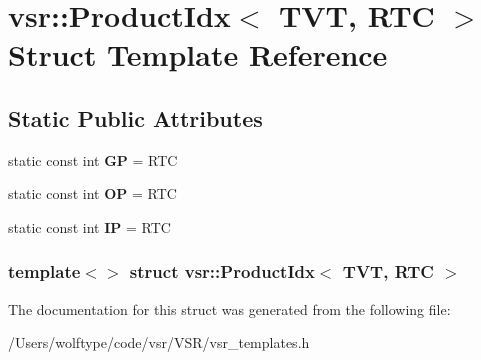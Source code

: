 \hypertarget{structvsr_1_1_product_idx_3_01_t_v_t_00_01_r_t_c_01_4}{\section{vsr\-:\-:Product\-Idx$<$ T\-V\-T, R\-T\-C $>$ Struct Template Reference}
\label{structvsr_1_1_product_idx_3_01_t_v_t_00_01_r_t_c_01_4}
}
\subsection*{Static Public Attributes}
\begin{DoxyCompactItemize}
\item 
\hypertarget{structvsr_1_1_product_idx_3_01_t_v_t_00_01_r_t_c_01_4_a86090849fcb1f5ce52d13ec021fcdabc}{static const int {\bfseries G\-P} = R\-T\-C}\label{structvsr_1_1_product_idx_3_01_t_v_t_00_01_r_t_c_01_4_a86090849fcb1f5ce52d13ec021fcdabc}

\item 
\hypertarget{structvsr_1_1_product_idx_3_01_t_v_t_00_01_r_t_c_01_4_a257314c812d5aa92244504b62511c43a}{static const int {\bfseries O\-P} = R\-T\-C}\label{structvsr_1_1_product_idx_3_01_t_v_t_00_01_r_t_c_01_4_a257314c812d5aa92244504b62511c43a}

\item 
\hypertarget{structvsr_1_1_product_idx_3_01_t_v_t_00_01_r_t_c_01_4_a1b6b128a259ef16fc0236467123d5942}{static const int {\bfseries I\-P} = R\-T\-C}\label{structvsr_1_1_product_idx_3_01_t_v_t_00_01_r_t_c_01_4_a1b6b128a259ef16fc0236467123d5942}

\end{DoxyCompactItemize}
\subsubsection*{template$<$$>$ struct vsr\-::\-Product\-Idx$<$ T\-V\-T, R\-T\-C $>$}



The documentation for this struct was generated from the following file\-:\begin{DoxyCompactItemize}
\item 
/\-Users/wolftype/code/vsr/\-V\-S\-R/vsr\-\_\-templates.\-h\end{DoxyCompactItemize}
